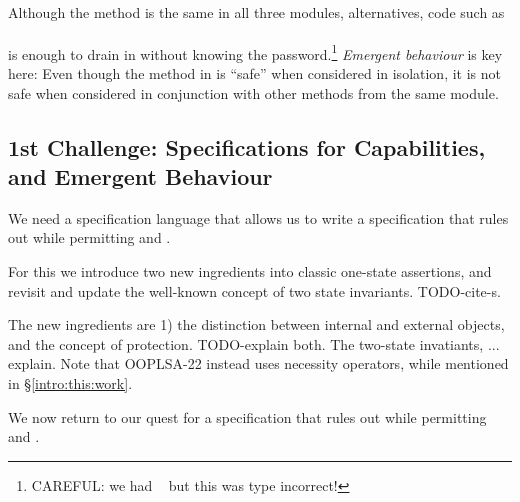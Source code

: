 \noindent
Although the  method is the same in
all three modules, alternatives, %
code  {such as}
\\ 
$\ \strut \hspace{.2in} $  
\\ 
is enough to drain   in \ModB without knowing the password.\footnote{CAREFUL: we had 
$\ \strut \hspace{.01in} $  but this was type incorrect!}
%
\emph{Emergent behaviour} is key here: 
Even though the method  in  \ModB is ``safe'' when considered in isolation, it is not safe when considered in conjunction with other methods from the same module. 


\subsection{1st Challenge: Specifications for  Capabilities, and Emergent Behaviour}
\label{s:approach:necopers}

We need  a specification language that allows us to write a specification that rules out \ModB while permitting \ModA and
\ModC.  

For this we introduce two new ingredients into classic one-state assertions, and revisit and update the well-known concept of two state invariants. TODO-cite-s.\

The new ingredients are 1) the distinction between internal and external objects, and the concept of protection. TODO-explain both.
The two-state invatiants, ... explain.
Note that OOPLSA-22 instead uses    necessity operators, while mentioned in  \S \ref{intro:this:work}. 

 


\label{s:bankSpecEx}

We now {return to our quest for} a specification that rules out \ModB while permitting \ModA and
\ModC. 


